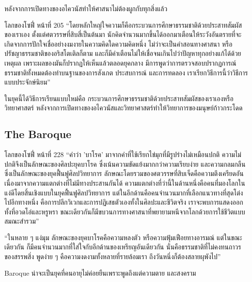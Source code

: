 หลังจากการเปิดทางของอไควนัสทำให้ศาสนาไม่ต้องผูกกับทุกสิ่งแล้ว

\begin{bookquote}{โลกของโซฟี่ หน้าที่ 205}
“โดยหลักใหญ่ใจความก็คือกระบวนการศึกษาธรรมชาติด้วยประสาทสัมผัสของเราเอง ตั้งแต่ศตวรรษที่สิบสี่เป็นต้นมา นักคิดจำนวนมากขึ้นได้ออกมาเตือนให้ระวังอันตรายที่จะเกิดจากการปักใจเชื่ออย่างงมงายในความคิดใดความคิดหนึ่ง ไม่ว่าจะเป็นคำสอนทางศาสนา หรือปรัชญาธรรมชาติของอริสโตเติลก็ตาม และก็มีคำเตือนไม่ให้เชื่อจนเกินไปว่าปัญหาทุกอย่างแก้ได้ด้วยเหตุผล เพราะผลของมันก็ปรากฏให้เห็นแล้วตลอดยุคกลาง มีการพูดว่าการตรวจสอบปรากฏการณ์ธรรมชาติทั้งหมดต้องทำบนฐานของการสังเกต ประสบการณ์ และการทดลอง เราเรียกวิธีการนี้ว่าวิธีการแบบประจักษ์นิยม”
\end{bookquote}

ในยุคนี้ได้วิธีการเรียนแบบใหม่คือ กระบวนการศึกษาธรรมชาติด้วยประสาทสัมผัสของเราเองหรือวิทยาศาสตร์ หลังจากการเปิดทางของอไควนัสและวิทยาศาสตร์ทำให้วิทยาการของมนุษย์ก้าวกระโดด

\subsection{The Baroque}

\begin{bookquote}{โลกของโซฟี่ หน้าที่ 228}
“คำว่า 'บาโรค' มาจากคำที่ใช้เรียกไข่มุกที่มีรูปร่างไม่เหมือนปกติ ความไม่ปกติจึงเป็นลักษณะของศิลปะยุคบาโรค ซึ่งเน้นความขัดแย้งมากกว่าความเรียบง่าย และความกลมกลืน ซึ่งเป็นลักษณะของยุคฟื้นฟูศิลปวิทยาการ ลักษณะโดยรวมของศตวรรษที่สิบเจ็ดคือความตึงเครียดอันเนื่องมาจากความแตกต่างที่ไม่มีทางประสานกันได้ ความแตกต่างที่ว่านี้ในด้านหนึ่งคือคนที่มองโลกในแง่ดีโดยสิ้นเชิงแบบในยุคฟื้นฟูศิลปวิทยาการ แต่ในอีกด้านคือคนจำนวนมากที่เลือกแนวทางที่สุดโต่งไปอีกทางหนึ่ง คือการปลีกวิเวกและการปฏิเสธตัวเองทั้งในศิลปะและชีวิตจริง เราจะพบการแสดงออกทั้งที่อวดโอ่และหรูหรา ขณะเดียวกันก็มีขบวนการทางศาสนาที่พยายามหนีจากโลกด้วยการใช้ชีวิตแบบสมณะสำรวม”

“ในหลาย ๆ แง่มุม ลักษณะของยุคบาโรคคือความหลงตัว หรือความฟุ้มเฟือยทางอารมณ์ แต่ในขณะเดียวกัน ก็มีคนจำนวนมากที่ใส่ใจกับอีกด้านของเหรียญอันเดียวกัน นั่นคือธรรมชาติที่ไม่คงทนถาวร ของสรรพสิ่ง พูดง่าย ๆ คือความงดงามทั้งหลายที่รายล้อมเรา ถึงวันหนึ่งก็ต้องสลายผุพังไป”
\end{bookquote}

Baroque น่าจะเป็นยุคที่คนอายุไม่ค่อยยืนเพราะพูดถึงแต่ความตาย และสงคราม

